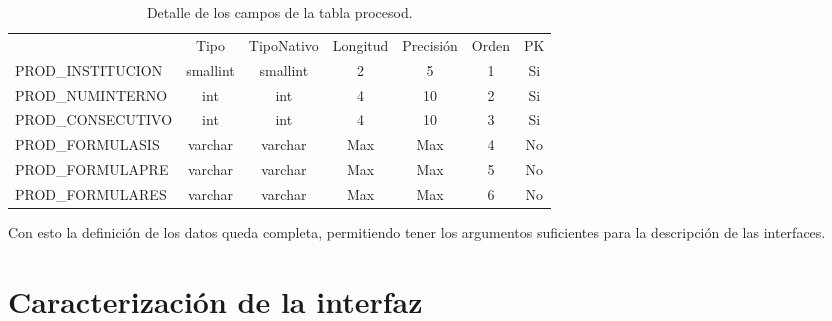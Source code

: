 				\begin{table}[H]
					\centering
					\caption{Detalle de los campos de la tabla procesod.}
					\label{tab_procesod}
					\begin{tabular}{|l|c|c|c|c|c|c|}
						\hline
						\rowcolor[HTML]{329A9D} 
						\multicolumn{7}{|c|}{\cellcolor[HTML]{329A9D}PROCESOD}                                                             \\ \hline
						\rowcolor[HTML]{00D2CB} 
						\multicolumn{1}{|c|}{\cellcolor[HTML]{00D2CB}Nombre} & Tipo     & TipoNativo & Longitud & Precisi\'on & Orden & PK \\ \hline
						PROD\_INSTITUCION                                    & smallint & smallint   & 2        & 5           & 1     & Si \\ \hline
						PROD\_NUMINTERNO                                     & int      & int        & 4        & 10          & 2     & Si \\ \hline
						PROD\_CONSECUTIVO                                    & int      & int        & 4        & 10          & 3     & Si \\ \hline
						PROD\_FORMULASIS                                     & varchar  & varchar    & Max      & Max         & 4     & No \\ \hline
						PROD\_FORMULAPRE                                     & varchar  & varchar    & Max      & Max         & 5     & No \\ \hline
						PROD\_FORMULARES                                     & varchar  & varchar    & Max      & Max         & 6     & No \\ \hline
					\end{tabular}
				\end{table}

				Con esto la definici\'on de los datos queda completa, permitiendo tener los argumentos suficientes para la descripci\'on de las interfaces.





	\section{Caracterizaci\'on de la interfaz}

